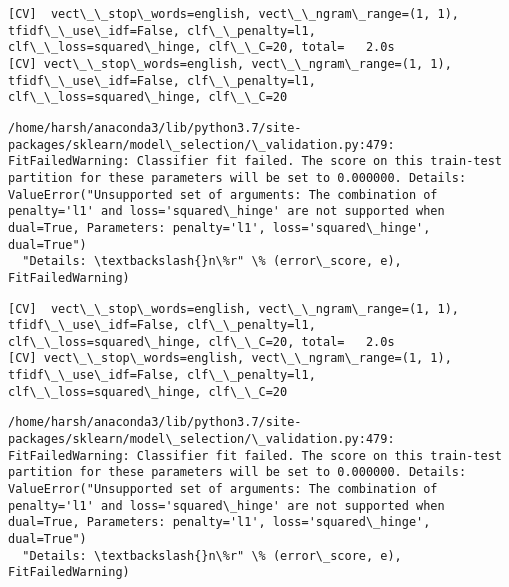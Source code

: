 \documentclass[11pt]{article}
\begin{document}
    \begin{Verbatim}[commandchars=\\\{\}]
[CV]  vect\_\_stop\_words=english, vect\_\_ngram\_range=(1, 1), tfidf\_\_use\_idf=False, clf\_\_penalty=l1, clf\_\_loss=squared\_hinge, clf\_\_C=20, total=   2.0s
[CV] vect\_\_stop\_words=english, vect\_\_ngram\_range=(1, 1), tfidf\_\_use\_idf=False, clf\_\_penalty=l1, clf\_\_loss=squared\_hinge, clf\_\_C=20 

    \end{Verbatim}

    \begin{Verbatim}[commandchars=\\\{\}]
/home/harsh/anaconda3/lib/python3.7/site-packages/sklearn/model\_selection/\_validation.py:479: FitFailedWarning: Classifier fit failed. The score on this train-test partition for these parameters will be set to 0.000000. Details: 
ValueError("Unsupported set of arguments: The combination of penalty='l1' and loss='squared\_hinge' are not supported when dual=True, Parameters: penalty='l1', loss='squared\_hinge', dual=True")
  "Details: \textbackslash{}n\%r" \% (error\_score, e), FitFailedWarning)

    \end{Verbatim}

    \begin{Verbatim}[commandchars=\\\{\}]
[CV]  vect\_\_stop\_words=english, vect\_\_ngram\_range=(1, 1), tfidf\_\_use\_idf=False, clf\_\_penalty=l1, clf\_\_loss=squared\_hinge, clf\_\_C=20, total=   2.0s
[CV] vect\_\_stop\_words=english, vect\_\_ngram\_range=(1, 1), tfidf\_\_use\_idf=False, clf\_\_penalty=l1, clf\_\_loss=squared\_hinge, clf\_\_C=20 

    \end{Verbatim}

    \begin{Verbatim}[commandchars=\\\{\}]
/home/harsh/anaconda3/lib/python3.7/site-packages/sklearn/model\_selection/\_validation.py:479: FitFailedWarning: Classifier fit failed. The score on this train-test partition for these parameters will be set to 0.000000. Details: 
ValueError("Unsupported set of arguments: The combination of penalty='l1' and loss='squared\_hinge' are not supported when dual=True, Parameters: penalty='l1', loss='squared\_hinge', dual=True")
  "Details: \textbackslash{}n\%r" \% (error\_score, e), FitFailedWarning)

    \end{Verbatim}
\end{document}
